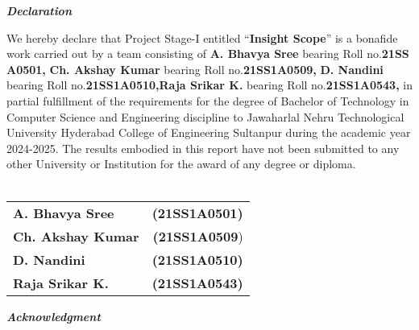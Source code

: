 \documentclass[12pt,a4paper]{report}
\begin{document}
\newpage
{}	
\begin{center}
{\LARGE \textbf{\textit{Declaration}}}
\end{center}	
\vspace{2cm}
We hereby declare that Project Stage-I entitled “\textbf{Insight Scope}” is a bonafide work carried out by a team consisting of \textbf{A. Bhavya Sree} bearing Roll no.\textbf{21SS\\A0501,}
\textbf{Ch. Akshay Kumar} bearing Roll no.\textbf{21SS1A0509,} \textbf{D. Nandini} bearing Roll no.\textbf{21SS1A0510,}\textbf{Raja Srikar K.} bearing Roll no.\textbf{21SS1A0543,} in partial fulfillment of the requirements for the degree of Bachelor of Technology in Computer Science and Engineering discipline to  Jawaharlal Nehru Technological University Hyderabad College of Engineering Sultanpur during the academic year 2024-2025. The results embodied in this report have not been submitted to any other University or Institution for the award of any degree or diploma.\\ \\
\vspace{4.0cm}
\begin{table}[ht]
	\begin{flushright}
		\begin{tabular}{l r}
		\textbf{\large A. Bhavya Sree} & \textbf{\large (21SS1A0501)}\\
        \textbf{\large Ch. Akshay Kumar} & \textbf{\large (21SS1A0509})\\
        \textbf{\large D. Nandini} & \textbf{\large (21SS1A0510)}\\
		\textbf{\large Raja Srikar K.} & \textbf{\large (21SS1A0543)}\\
	\end{tabular}
	\end{flushright}
\end{table}
\newpage
{}	
\begin{center}
{\LARGE \textbf{\textit{Acknowledgment}}}
\end{center}
\vspace{1cm}
\end{document}
